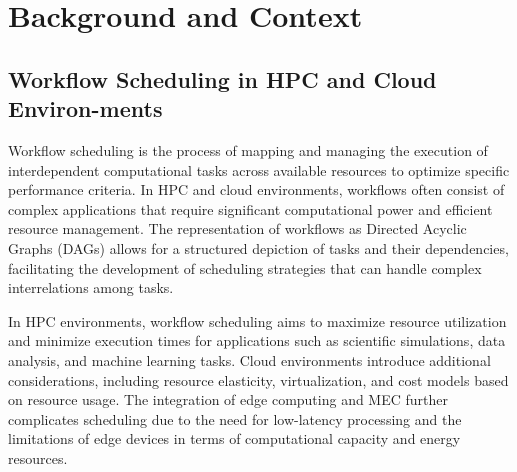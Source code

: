 \documentclass[a4paper, final]{article}
\begin{document}
\newpage
\section{Background and Context}
\subsection{Workflow Scheduling in HPC and Cloud Environ-ments}
Workflow scheduling is the process of mapping and managing the execution of interdependent computational tasks 
across available resources to optimize specific performance criteria. In HPC and cloud environments, workflows often 
consist of complex applications that require significant computational power and efficient resource management. The 
representation of workflows as Directed Acyclic Graphs (DAGs) allows for a structured depiction of tasks and their 
dependencies, facilitating the development of scheduling strategies that can handle complex interrelations among tasks.

In HPC environments, workflow scheduling aims to maximize resource utilization and minimize execution times for applications 
such as scientific simulations, data analysis, and machine learning tasks. Cloud environments introduce additional 
considerations, including resource elasticity, virtualization, and cost models based on resource usage. The integration 
of edge computing and MEC further complicates scheduling due to the need for low-latency processing and the limitations 
of edge devices in terms of computational capacity and energy resources.
\end{document}
